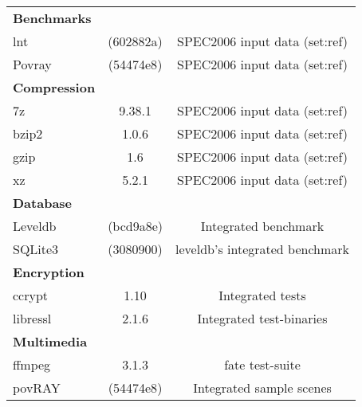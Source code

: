 \begin{longtable}{lcC} \toprule
         &  & \\
    \midrule
    \textbf{Benchmarks}\\
    lnt                      & (602882a)               & SPEC2006 input data (set:ref)\\
    Povray                   & (54474e8)               & SPEC2006 input data (set:ref)\\
    \midrule
    \textbf{Compression}\\
    7z                       & 9.38.1                  & SPEC2006 input data (set:ref)\\
    bzip2                    & 1.0.6                   & SPEC2006 input data (set:ref)\\
    gzip                     & 1.6                     & SPEC2006 input data (set:ref)\\
    xz                       & 5.2.1                   & SPEC2006 input data (set:ref)\\
    \midrule
    \textbf{Database}\\
    Leveldb                  & (bcd9a8e)               & Integrated benchmark\\
    SQLite3                  & (3080900)               & leveldb's integrated benchmark\\
    \midrule
    \textbf{Encryption}\\
    ccrypt                   & 1.10                    & Integrated tests\\
    libressl                 & 2.1.6                   & Integrated test-binaries\\
    \midrule
    \textbf{Multimedia}\\
    ffmpeg                   & 3.1.3                   & fate test-suite\\
    povRAY                   & (54474e8)               & Integrated sample scenes\\

\end{longtable}
